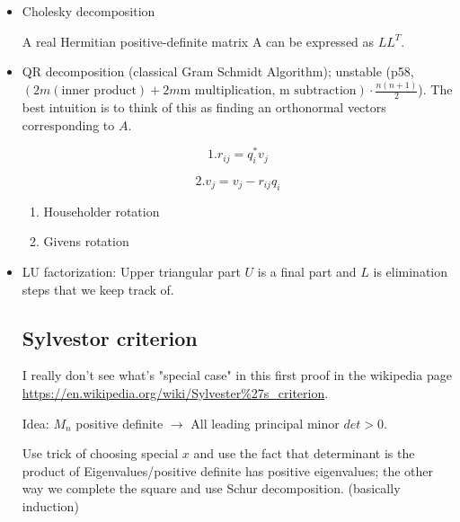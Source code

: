 \documentclass{article}
\theoremstyle{remark}
\begin{document}
\begin{itemize}
\begin{proof}
\end{proof}
\item Cholesky decomposition

A real Hermitian positive-definite matrix A can be expressed as $LL^T$.
\item QR decomposition (classical Gram Schmidt Algorithm); unstable (p58, $(2m(\text{inner product})+2m\text{m multiplication, m subtraction})\cdot \frac{n(n+1)}2$). The best intuition is to think of this as finding an orthonormal vectors corresponding to $A$.

$$1. r_{ij}=q_i^*v_j$$

$$2. v_j=v_j-r_{ij}q_i$$
\begin{enumerate}
\item Householder rotation


\item Givens rotation

\end{enumerate}
\item LU factorization: Upper triangular part $U$ is a final part and $L$ is elimination steps that we keep track of.
\subsection*{Sylvestor criterion}
 I really don't see what's "special case" in this first proof in the wikipedia page \url{https://en.wikipedia.org/wiki/Sylvester%27s_criterion}. 

Idea: $M_n$ positive definite $\to$ All leading principal minor $det>0$.

Use trick of choosing special $x$ and use the fact that determinant is the product of Eigenvalues/positive definite has positive eigenvalues; the other way we complete the square and use Schur decomposition. (basically induction)
\end{itemize}
\end{document}
